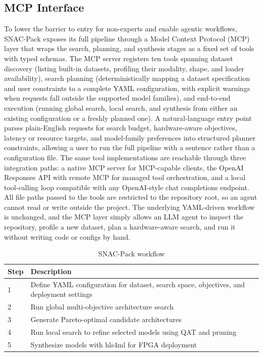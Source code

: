 \documentclass[11pt]{article}
\begin{document}
\subsection{MCP Interface}
To lower the barrier to entry for non-experts and enable agentic workflows, SNAC-Pack exposes its full pipeline through a Model Context Protocol (MCP) layer that wraps the search, planning, and synthesis stages as a fixed set of tools with typed schemas.
The MCP server registers ten tools spanning dataset discovery (listing built-in datasets, profiling their modality, shape, and loader availability), search planning (deterministically mapping a dataset specification and user constraints to a complete YAML configuration, with explicit warnings when requests fall outside the supported model families), and end-to-end execution (running global search, local search, and synthesis from either an existing configuration or a freshly planned one).
A natural-language entry point parses plain-English requests for search budget, hardware-aware objectives, latency or resource targets, and model-family preferences into structured planner constraints, allowing a user to run the full pipeline with a sentence rather than a configuration file.
The same tool implementations are reachable through three integration paths: a native MCP server for MCP-capable clients, the OpenAI Responses API with remote MCP for managed tool orchestration, and a local tool-calling loop compatible with any OpenAI-style chat completions endpoint.
All file paths passed to the tools are restricted to the repository root, so an agent cannot read or write outside the project.
The underlying YAML-driven workflow is unchanged, and the MCP layer simply allows an LLM agent to inspect the repository, profile a new dataset, plan a hardware-aware search, and run it without writing code or configs by hand.

\begin{table}[ht]
\centering
\caption{SNAC-Pack workflow}
\label{tab:workflow}

\begin{tabular}{ll}
\toprule
Step & Description \\
\midrule

1 & Define YAML configuration for dataset, search space, objectives, and deployment settings \\

2 & Run global multi-objective architecture search \\

3 & Generate Pareto-optimal candidate architectures \\

4 & Run local search to refine selected models using QAT and pruning \\

5 & Synthesize models with hls4ml for FPGA deployment \\

\bottomrule
\end{tabular}

\end{table}
\end{document}
